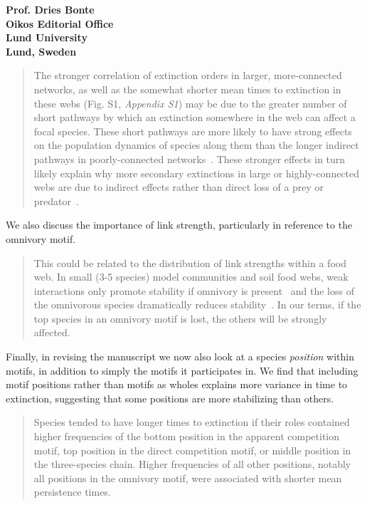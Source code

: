 \documentclass[12pt]{letter}
\begin{document}
\begin{letter}{\bf Prof. Dries Bonte\\
Oikos Editorial Office \\
Lund University \\
Lund, Sweden}
\begin{quotation}
        The stronger correlation of extinction orders in larger, more-connected networks, as well as the somewhat shorter mean times to extinction in these webs (Fig. S1, \emph{Appendix S1}) may be due to the greater number of short pathways by which an extinction somewhere in the web can affect a focal species. 
		These short pathways are more likely to have strong effects on the population dynamics of species along them than the longer indirect pathways in poorly-connected networks~\citep{Jordan2002,Jordan2006}.
		These stronger effects in turn likely explain why more secondary extinctions in large or highly-connected webs are due to indirect effects rather than direct loss of a prey or predator~\citep{Wootton2016a}. 

    \end{quotation}
    
    We also discuss the importance of link strength, particularly in reference to the omnivory motif.
    
    \begin{quotation}
        This could be related to the distribution of link strengths within a food web.
        In small (3-5 species) model communities and soil food webs, weak interactions only promote stability if omnivory is present~\citep{Neutel2002,Emmerson2004} and the loss of the omnivorous species dramatically reduces stability~\citep{Emmerson2004}.
        In our terms, if the top species in an omnivory motif is lost, the others will be strongly affected.

    \end{quotation}
    
    Finally, in revising the manuscript we now also look at a species \emph{position} within motifs, in addition to simply the motifs it participates in. We find that including motif positions rather than motifs as wholes explains more variance in time to extinction, suggesting that some positions are more stabilizing than others.
    
    \begin{quotation}
        Species tended to have longer times to extinction if their roles contained higher frequencies of the bottom position in the apparent competition motif, top position in the direct competition motif, or middle position in the three-species chain.
        Higher frequencies of all other positions, notably all positions in the omnivory motif, were associated with shorter mean persistence times.

    \end{quotation}



\end{letter}
\end{document}
